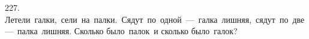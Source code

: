 227. Летели галки, сели на палки. Сядут по одной --- галка лишняя, сядут по две --- палка лишняя. Сколько было палок и сколько было галок?\\
